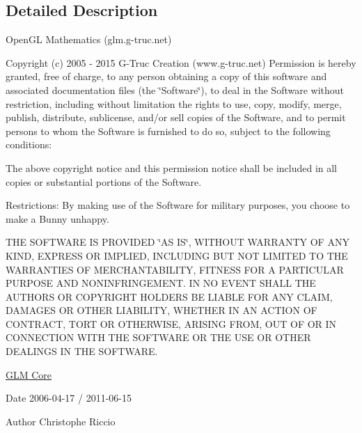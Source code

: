 \subsection{Detailed Description}
Open\-G\-L Mathematics (glm.\-g-\/truc.\-net)

Copyright (c) 2005 -\/ 2015 G-\/\-Truc Creation (www.\-g-\/truc.\-net) Permission is hereby granted, free of charge, to any person obtaining a copy of this software and associated documentation files (the \char`\"{}\-Software\char`\"{}), to deal in the Software without restriction, including without limitation the rights to use, copy, modify, merge, publish, distribute, sublicense, and/or sell copies of the Software, and to permit persons to whom the Software is furnished to do so, subject to the following conditions\-:

The above copyright notice and this permission notice shall be included in all copies or substantial portions of the Software.

Restrictions\-: By making use of the Software for military purposes, you choose to make a Bunny unhappy.

T\-H\-E S\-O\-F\-T\-W\-A\-R\-E I\-S P\-R\-O\-V\-I\-D\-E\-D \char`\"{}\-A\-S I\-S\char`\"{}, W\-I\-T\-H\-O\-U\-T W\-A\-R\-R\-A\-N\-T\-Y O\-F A\-N\-Y K\-I\-N\-D, E\-X\-P\-R\-E\-S\-S O\-R I\-M\-P\-L\-I\-E\-D, I\-N\-C\-L\-U\-D\-I\-N\-G B\-U\-T N\-O\-T L\-I\-M\-I\-T\-E\-D T\-O T\-H\-E W\-A\-R\-R\-A\-N\-T\-I\-E\-S O\-F M\-E\-R\-C\-H\-A\-N\-T\-A\-B\-I\-L\-I\-T\-Y, F\-I\-T\-N\-E\-S\-S F\-O\-R A P\-A\-R\-T\-I\-C\-U\-L\-A\-R P\-U\-R\-P\-O\-S\-E A\-N\-D N\-O\-N\-I\-N\-F\-R\-I\-N\-G\-E\-M\-E\-N\-T. I\-N N\-O E\-V\-E\-N\-T S\-H\-A\-L\-L T\-H\-E A\-U\-T\-H\-O\-R\-S O\-R C\-O\-P\-Y\-R\-I\-G\-H\-T H\-O\-L\-D\-E\-R\-S B\-E L\-I\-A\-B\-L\-E F\-O\-R A\-N\-Y C\-L\-A\-I\-M, D\-A\-M\-A\-G\-E\-S O\-R O\-T\-H\-E\-R L\-I\-A\-B\-I\-L\-I\-T\-Y, W\-H\-E\-T\-H\-E\-R I\-N A\-N A\-C\-T\-I\-O\-N O\-F C\-O\-N\-T\-R\-A\-C\-T, T\-O\-R\-T O\-R O\-T\-H\-E\-R\-W\-I\-S\-E, A\-R\-I\-S\-I\-N\-G F\-R\-O\-M, O\-U\-T O\-F O\-R I\-N C\-O\-N\-N\-E\-C\-T\-I\-O\-N W\-I\-T\-H T\-H\-E S\-O\-F\-T\-W\-A\-R\-E O\-R T\-H\-E U\-S\-E O\-R O\-T\-H\-E\-R D\-E\-A\-L\-I\-N\-G\-S I\-N T\-H\-E S\-O\-F\-T\-W\-A\-R\-E.

\hyperlink{group__core}{G\-L\-M Core}

\begin{DoxyDate}{Date}
2006-\/04-\/17 / 2011-\/06-\/15 
\end{DoxyDate}
\begin{DoxyAuthor}{Author}
Christophe Riccio 
\end{DoxyAuthor}
